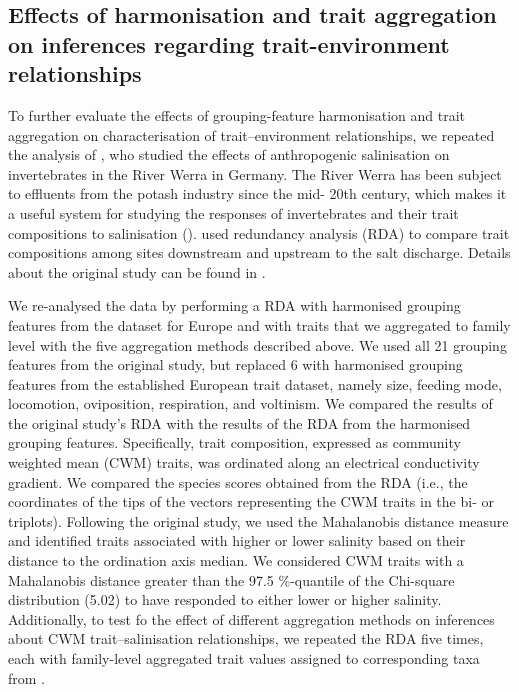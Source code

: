 \documentclass[12pt]{article}
\begin{document}
\newpage


\subsection*{Effects of harmonisation and trait aggregation on inferences regarding trait-environment relationships}

To further evaluate the effects of grouping-feature harmonisation and trait aggregation on characterisation of trait–environment relationships, we repeated the analysis of \citet{szocs_effects_2014}, who studied the effects of anthropogenic salinisation on invertebrates in the River Werra in Germany. The River Werra has been subject to effluents from the potash industry since the mid- 20th century, which makes it a useful system for studying the responses of invertebrates and their trait compositions to salinisation (\cite{bathe_biological_2011}). \citet{szocs_effects_2014}  used redundancy analysis (RDA) to compare trait compositions among sites downstream and upstream to the salt discharge. Details about the original study can be found in \citet{szocs_effects_2014}.

We re-analysed the \citet{szocs_effects_2014} data by performing a RDA with harmonised grouping features from the dataset for Europe and with traits that we aggregated to family level with the five aggregation methods described above. We used all 21 grouping features from the original study, but replaced 6 with harmonised grouping features from the established European trait dataset, namely size, feeding mode, locomotion, oviposition, respiration, and voltinism.
We compared the results of the original study’s RDA with the results of the RDA from the harmonised grouping features. Specifically, trait composition, expressed as community weighted mean (CWM) traits, was ordinated along an electrical conductivity gradient. We compared the species scores obtained from the RDA (i.e., the coordinates of the tips of the vectors representing the CWM traits in the bi- or triplots). Following the original study, we used the Mahalanobis distance measure and identified traits associated with higher or lower salinity based on their distance to the ordination axis median. We considered CWM traits with a Mahalanobis distance greater than the 97.5 \%-quantile of the Chi-square distribution (5.02) to have responded to either lower or higher salinity. Additionally, to test fo the effect of different aggregation methods on inferences about CWM trait–salinisation relationships, we repeated the RDA five times, each with family-level aggregated trait values assigned to corresponding taxa from \citet{szocs_effects_2014}.
\end{document}
